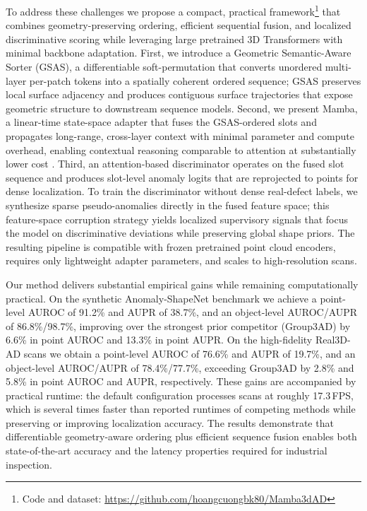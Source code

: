 To address these challenges we propose a compact, practical framework\footnote{Code and dataset: \url{https://github.com/hoangcuongbk80/Mamba3dAD}} that combines geometry-preserving ordering, efficient sequential fusion, and localized discriminative scoring while leveraging large pretrained 3D Transformers with minimal backbone adaptation. First, we introduce a Geometric Semantic-Aware Sorter (GSAS), a differentiable soft-permutation that converts unordered multi-layer per-patch tokens into a spatially coherent ordered sequence; GSAS preserves local surface adjacency and produces contiguous surface trajectories that expose geometric structure to downstream sequence models. Second, we present Mamba, a linear-time state-space adapter that fuses the GSAS-ordered slots and propagates long-range, cross-layer context with minimal parameter and compute overhead, enabling contextual reasoning comparable to attention at substantially lower cost \cite{gu2021efficiently,gu2020hippo}. Third, an attention-based discriminator operates on the fused slot sequence and produces slot-level anomaly logits that are reprojected to points for dense localization. To train the discriminator without dense real-defect labels, we synthesize sparse pseudo-anomalies directly in the fused feature space; this feature-space corruption strategy yields localized supervisory signals that focus the model on discriminative deviations while preserving global shape priors. The resulting pipeline is compatible with frozen pretrained point cloud encoders, requires only lightweight adapter parameters, and scales to high-resolution scans.

Our method delivers substantial empirical gains while remaining computationally practical. On the synthetic Anomaly-ShapeNet benchmark we achieve a point-level AUROC of 91.2\% and AUPR of 38.7\%, and an object-level AUROC/AUPR of 86.8\%/98.7\%, improving over the strongest prior competitor (Group3AD) by 6.6\%  in point AUROC and 13.3\% in point AUPR. On the high-fidelity Real3D-AD scans we obtain a point-level AUROC of 76.6\% and AUPR of 19.7\%, and an object-level AUROC/AUPR of 78.4\%/77.7\%, exceeding Group3AD by 2.8\% and 5.8\% in point AUROC and AUPR, respectively. These gains are accompanied by practical runtime: the default configuration processes scans at roughly 17.3\,FPS, which is several times faster than reported runtimes of competing methods while preserving or improving localization accuracy. The results demonstrate that differentiable geometry-aware ordering plus efficient sequence fusion enables both state-of-the-art accuracy and the latency properties required for industrial inspection.

